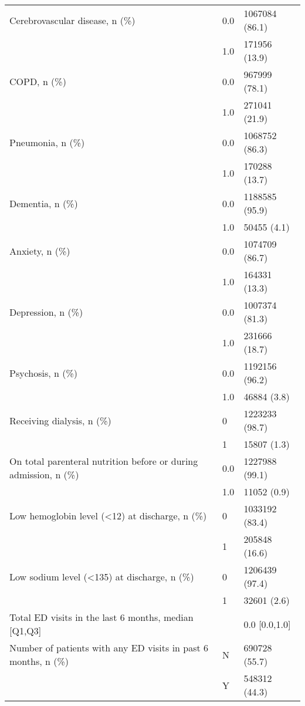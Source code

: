 \begin{tabular}{lll}
Cerebrovascular disease, n (\%) & 0.0 &     1067084 (86.1) \\
                                       & 1.0 &      171956 (13.9) \\
COPD, n (\%) & 0.0 &      967999 (78.1) \\
                                       & 1.0 &      271041 (21.9) \\
Pneumonia, n (\%) & 0.0 &     1068752 (86.3) \\
                                       & 1.0 &      170288 (13.7) \\
Dementia, n (\%) & 0.0 &     1188585 (95.9) \\
                                       & 1.0 &        50455 (4.1) \\
Anxiety, n (\%) & 0.0 &     1074709 (86.7) \\
                                       & 1.0 &      164331 (13.3) \\
Depression, n (\%) & 0.0 &     1007374 (81.3) \\
                                       & 1.0 &      231666 (18.7) \\
Psychosis, n (\%) & 0.0 &     1192156 (96.2) \\
                                       & 1.0 &        46884 (3.8) \\
Receiving dialysis, n (\%) & 0 &     1223233 (98.7) \\
                                       & 1 &        15807 (1.3) \\
On total parenteral nutrition before or during admission, n (\%) & 0.0 &     1227988 (99.1) \\
                                       & 1.0 &        11052 (0.9) \\
Low hemoglobin level (<12) at discharge, n (\%) & 0 &     1033192 (83.4) \\
                                       & 1 &      205848 (16.6) \\
Low sodium level (<135) at discharge, n (\%) & 0 &     1206439 (97.4) \\
                                       & 1 &        32601 (2.6) \\
Total ED visits in the last 6 months, median [Q1,Q3] &   &      0.0 [0.0,1.0] \\
Number of patients with any ED visits in past 6 months, n (\%) & N &      690728 (55.7) \\
                                       & Y &      548312 (44.3) \\

\end{tabular}
